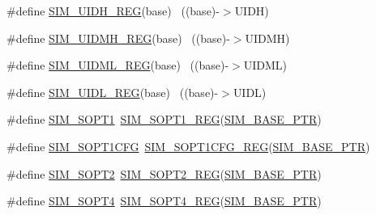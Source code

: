 \begin{DoxyCompactItemize}
\item 
\#define \hyperlink{group___s_i_m___register___accessor___macros_ga2c1fe45ab77b346f67b2f3bb2f59519a}{S\+I\+M\+\_\+\+U\+I\+D\+H\+\_\+\+R\+EG}(base)                                          ~((base)-\/$>$U\+I\+DH)
\item 
\#define \hyperlink{group___s_i_m___register___accessor___macros_gaffd69cc3f48c0e204d8c659424b4c51d}{S\+I\+M\+\_\+\+U\+I\+D\+M\+H\+\_\+\+R\+EG}(base)                                        ~((base)-\/$>$U\+I\+D\+MH)
\item 
\#define \hyperlink{group___s_i_m___register___accessor___macros_gaac80320f7e56ccd1cd6b54cfdc322430}{S\+I\+M\+\_\+\+U\+I\+D\+M\+L\+\_\+\+R\+EG}(base)                                        ~((base)-\/$>$U\+I\+D\+ML)
\item 
\#define \hyperlink{group___s_i_m___register___accessor___macros_ga50225b2615456e0a763efbe4ec59b077}{S\+I\+M\+\_\+\+U\+I\+D\+L\+\_\+\+R\+EG}(base)                                          ~((base)-\/$>$U\+I\+DL)
\item 
\#define \hyperlink{group___s_i_m___register___accessor___macros_ga2a1bceb27d0e81b2821f1f4f32a57c12}{S\+I\+M\+\_\+\+S\+O\+P\+T1}~\hyperlink{group___s_i_m___register___accessor___macros_ga4fb13e9e7e8bf019daf19284be9b0a73}{S\+I\+M\+\_\+\+S\+O\+P\+T1\+\_\+\+R\+EG}(\hyperlink{group___s_i_m___peripheral_ga719ec5df95fbb5732438f794f2cccf3c}{S\+I\+M\+\_\+\+B\+A\+S\+E\+\_\+\+P\+TR})
\item 
\#define \hyperlink{group___s_i_m___register___accessor___macros_ga952eea950ed91143774362df3d00d2b1}{S\+I\+M\+\_\+\+S\+O\+P\+T1\+C\+FG}~\hyperlink{group___s_i_m___register___accessor___macros_ga2eac749528469c06ed7ac6d54070fdbd}{S\+I\+M\+\_\+\+S\+O\+P\+T1\+C\+F\+G\+\_\+\+R\+EG}(\hyperlink{group___s_i_m___peripheral_ga719ec5df95fbb5732438f794f2cccf3c}{S\+I\+M\+\_\+\+B\+A\+S\+E\+\_\+\+P\+TR})
\item 
\#define \hyperlink{group___s_i_m___register___accessor___macros_ga487453818a3716783fc75d7bcb81de9f}{S\+I\+M\+\_\+\+S\+O\+P\+T2}~\hyperlink{group___s_i_m___register___accessor___macros_ga94d1a56cbf8d6fbebbd00363ce3cd130}{S\+I\+M\+\_\+\+S\+O\+P\+T2\+\_\+\+R\+EG}(\hyperlink{group___s_i_m___peripheral_ga719ec5df95fbb5732438f794f2cccf3c}{S\+I\+M\+\_\+\+B\+A\+S\+E\+\_\+\+P\+TR})
\item 
\#define \hyperlink{group___s_i_m___register___accessor___macros_ga22e96af138319442871c6c16b31c996f}{S\+I\+M\+\_\+\+S\+O\+P\+T4}~\hyperlink{group___s_i_m___register___accessor___macros_gae47c458103d1381ff7b7f25e45338a64}{S\+I\+M\+\_\+\+S\+O\+P\+T4\+\_\+\+R\+EG}(\hyperlink{group___s_i_m___peripheral_ga719ec5df95fbb5732438f794f2cccf3c}{S\+I\+M\+\_\+\+B\+A\+S\+E\+\_\+\+P\+TR})

\end{DoxyCompactItemize}
